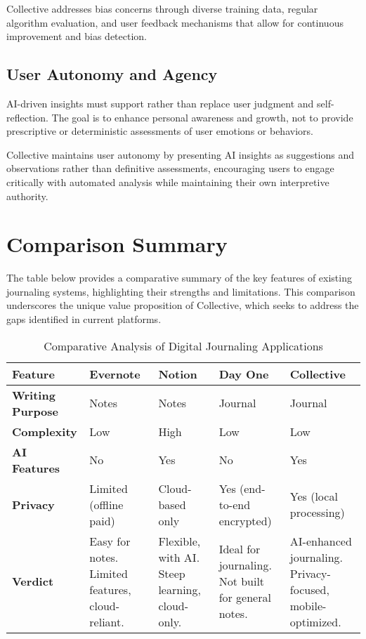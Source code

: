 Collective addresses bias concerns through diverse training data, regular algorithm evaluation, and user feedback mechanisms that allow for continuous improvement and bias detection.

\subsection{User Autonomy and Agency}\label{subsec:autonomy}

AI-driven insights must support rather than replace user judgment and self-reflection. The goal is to enhance personal awareness and growth, not to provide prescriptive or deterministic assessments of user emotions or behaviors.

Collective maintains user autonomy by presenting AI insights as suggestions and observations rather than definitive assessments, encouraging users to engage critically with automated analysis while maintaining their own interpretive authority.

\section{Comparison Summary}\label{sec:comparison}

The table below provides a comparative summary of the key features of existing journaling systems, highlighting their strengths and limitations. This comparison underscores the unique value proposition of Collective, which seeks to address the gaps identified in current platforms.

\begin{table}[H]
\centering
\caption{Comparative Analysis of Digital Journaling Applications}
\label{tab:comparison}
\begin{tabular}{|p{3cm}|p{2.5cm}|p{2.5cm}|p{2.5cm}|p{2.5cm}|}
\hline
\textbf{Feature} & \textbf{Evernote} & \textbf{Notion} & \textbf{Day One} & \textbf{Collective} \\
\hline
\textbf{Writing Purpose} & Notes & Notes & Journal & Journal \\
\hline
\textbf{Complexity} & Low & High & Low & Low \\
\hline
\textbf{AI Features} & No & Yes & No & Yes \\
\hline
\textbf{Privacy} & Limited (offline paid) & Cloud-based only & Yes (end-to-end encrypted) & Yes (local processing) \\
\hline
\textbf{Verdict} & Easy for notes. Limited features, cloud-reliant. & Flexible, with AI. Steep learning, cloud-only. & Ideal for journaling. Not built for general notes. & AI-enhanced journaling. Privacy-focused, mobile-optimized. \\
\hline
\end{tabular}
\end{table}

